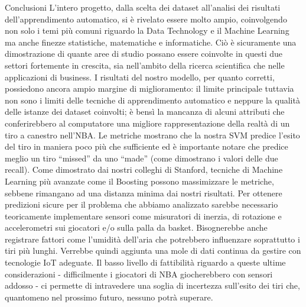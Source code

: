 Conclusioni
L’intero progetto, dalla scelta dei dataset all’analisi dei risultati dell’apprendimento automatico, si è rivelato essere molto ampio, coinvolgendo non solo i temi più comuni riguardo la Data Technology e il Machine Learning ma anche finezze statistiche, matematiche e informatiche. Ciò è sicuramente una dimostrazione di quante aree di studio possano essere coinvolte in questi due settori fortemente in crescita, sia nell’ambito della ricerca scientifica che nelle applicazioni di business.
I risultati del nostro modello, per quanto corretti, possiedono ancora ampio margine di miglioramento: il limite principale tuttavia non sono i limiti delle tecniche di apprendimento automatico e neppure la qualità delle istanze dei dataset coinvolti; è bensì la mancanza di alcuni attributi che conferirebbero al computatore una migliore rappresentazione della realtà di un tiro a canestro nell’NBA.
Le metriche mostrano che la nostra SVM predice l’esito del tiro in maniera poco più che sufficiente ed è importante notare che predice meglio un tiro “missed” da uno “made” (come dimostrano i valori delle due recall).
Come dimostrato dai nostri colleghi di Stanford, tecniche di Machine Learning più avanzate come il Boosting possono massimizzare le metriche, sebbene rimangano ad una distanza minima dai nostri risultati.
Per ottenere predizioni sicure per il problema che abbiamo analizzato sarebbe necessario teoricamente implementare sensori come misuratori di inerzia, di rotazione e accelerometri sui giocatori e/o sulla palla da basket. Bisognerebbe anche registrare fattori come l’umidità dell’aria che potrebbero influenzare soprattutto i tiri più lunghi. Verrebbe quindi aggiunta una mole di dati continua da gestire con tecnologie IoT adeguate. Il basso livello di fattibilità riguardo a queste ultime considerazioni - difficilmente i giocatori di NBA giocherebbero con sensori addosso - ci permette di intravedere una soglia di incertezza sull’esito dei tiri che, quantomeno nel prossimo futuro, nessuno potrà superare.